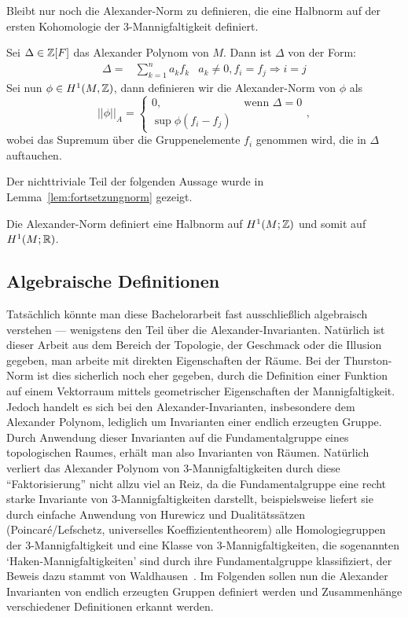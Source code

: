     	Bleibt nur noch die Alexander-Norm zu definieren, die eine Halbnorm auf der ersten Kohomologie der 3-Mannigfaltigkeit definiert.
    	\begin{defn}
    		Sei  $\Delta \in \mathbb{Z} [F]$ das Alexander Polynom von $M$. Dann ist $\Delta$ von der Form:
    		\begin{align*}
    		    			\Delta = &\sum_{k=1}^n a_k f_k& a_k \neq 0, f_i = f_j \Rightarrow i=j
    		\end{align*}
    		Sei nun $\phi \in H^1 (M,\mathbb{Z})$, dann definieren wir die Alexander-Norm von $\phi$ als
    		\[
    			||\phi||_A = \begin{cases}
    				0 , &\text{ wenn } \Delta=0\\
    				\sup \phi (f_i - f_j) &
    			\end{cases},
    		\]
    		wobei das Supremum über die Gruppenelemente $f_i$ genommen wird, die in $\Delta$ auftauchen.
    	\end{defn}

    	Der nichttriviale Teil der folgenden Aussage wurde in Lemma~\ref{lem:fortsetzungnorm} gezeigt.
    	\begin{lem}
    		Die Alexander-Norm definiert eine Halbnorm auf $H^1(M;\mathbb{Z})$ und somit auf $H^1(M;\mathbb{R})$.
    	\end{lem}


    \subsection{Algebraische Definitionen}
\label{sec:algebra}

Tatsächlich könnte man diese Bachelorarbeit fast ausschließlich algebraisch verstehen --- wenigstens den Teil über die Alexander-Invarianten. Natürlich ist dieser Arbeit aus dem Bereich der Topologie, der Geschmack oder die Illusion gegeben, man arbeite mit direkten Eigenschaften der Räume. Bei der Thurston-Norm ist dies sicherlich noch eher gegeben, durch die Definition einer Funktion auf einem Vektorraum mittels geometrischer Eigenschaften der Mannigfaltigkeit. Jedoch handelt es sich bei den Alexander-Invarianten, insbesondere dem Alexander Polynom, lediglich um Invarianten einer endlich erzeugten Gruppe. Durch Anwendung dieser Invarianten auf die Fundamentalgruppe eines topologischen Raumes, erhält man also Invarianten von Räumen. Natürlich verliert das Alexander Polynom von 3-Mannigfaltigkeiten durch diese "`Faktorisierung"' nicht allzu viel an Reiz, da die Fundamentalgruppe eine recht starke Invariante von 3-Mannigfaltigkeiten darstellt, beispielsweise liefert sie durch einfache Anwendung von Hurewicz und Dualitätssätzen (Poincaré/Lefschetz, universelles Koeffiziententheorem) alle Homologiegruppen der 3-Mannigfaltigkeit und eine Klasse von 3-Mannigfaltigkeiten, die sogenannten `Haken-Mannigfaltigkeiten' sind durch ihre Fundamentalgruppe klassifiziert, der Beweis dazu stammt von Waldhausen~\cite{Waldhausen.1968}. Im Folgenden sollen nun die Alexander Invarianten von endlich erzeugten Gruppen definiert werden und Zusammenhänge verschiedener Definitionen erkannt werden.

